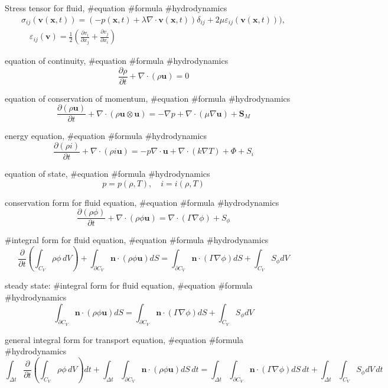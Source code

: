 Stress tensor for fluid, #equation #formula #hydrodynamics
$$
\begin{array}{l}
\sigma_{ij}({\boldsymbol v}({\boldsymbol x},t))=(-p({\boldsymbol x},t)+\lambda\nabla\cdot{\boldsymbol v}({\boldsymbol x},t))\delta_{ij}+2\mu\varepsilon_{ij}({\boldsymbol v}({\boldsymbol x},t))), \\
\quad \varepsilon_{ij}({\boldsymbol v})=\frac{1}{2}\left(\frac{\partial v_i}{\partial x_j}+\frac{\partial v_j}{\partial x_i}\right)
\end{array}
$$

equation of continuity,  #equation #formula #hydrodynamics
$$
\frac{\partial \rho}{\partial t}+\nabla\cdot(\rho{\boldsymbol u})=0
$$

equation of conservation of momentum, #equation #formula #hydrodynamics
$$
\frac{\partial (\rho{\boldsymbol u})}{\partial t}+\nabla\cdot(\rho{\boldsymbol u}\otimes{\boldsymbol u})=-\nabla p+\nabla\cdot(\mu\nabla{\boldsymbol u})+{\boldsymbol S}_M
$$

energy equation, #equation #formula #hydrodynamics
$$
\frac{\partial (\rho i)}{\partial t}+\nabla\cdot(\rho i{\boldsymbol u})=-p\nabla\cdot{\boldsymbol u}+\nabla\cdot(k \nabla T)+\Phi+S_i
$$

equation of state, #equation #formula #hydrodynamics
$$
p=p(\rho,T),\quad i=i(\rho,T)
$$

conservation form for fluid equation, #equation #formula #hydrodynamics
$$
\frac{\partial(\rho \phi)}{\partial t}+\nabla\cdot(\rho\phi{\boldsymbol u})=\nabla\cdot(\Gamma\nabla\phi)+S_\phi
$$

#integral form for fluid equation, #equation #formula #hydrodynamics
$$
\frac{\partial}{\partial t}\left(\int_{C_V}\rho \phi\,dV\right)+\int_{\partial C_V}{\boldsymbol n}\cdot(\rho\phi{\boldsymbol u})dS=\int_{\partial C_V}{\boldsymbol n}\cdot(\Gamma\nabla\phi)dS+\int_{C_V}S_\phi dV
$$

steady state: #integral form for fluid equation, #equation #formula #hydrodynamics
$$
\int_{\partial C_V}{\boldsymbol n}\cdot(\rho\phi{\boldsymbol u})dS=\int_{\partial C_V}{\boldsymbol n}\cdot(\Gamma\nabla\phi)dS+\int_{C_V}S_\phi dV
$$

general integral form for transport equation, #equation #formula #hydrodynamics
$$
\int_{\Delta t}\frac{\partial}{\partial t}\left(\int_{C_V}\rho \phi\,dV\right)dt+\int_{\Delta t}\int_{\partial C_V}{\boldsymbol n}\cdot(\rho\phi{\boldsymbol u})dS\,dt=\int_{\Delta t}\int_{\partial C_V}{\boldsymbol n}\cdot(\Gamma\nabla\phi)dS\,dt+\int_{\Delta t}\int_{C_V}S_\phi dV\,dt
$$

